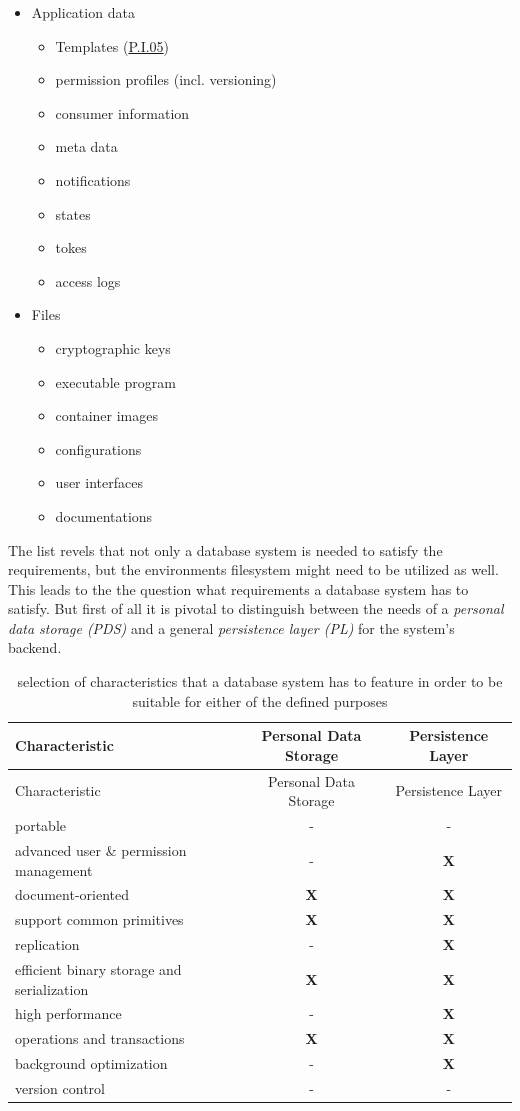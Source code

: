 \documentclass[12pt,english,a4paper,titlepage,cleardoublepage=empty,dottedtoc]{report}
\providecommand{\tightlist}{%
  \setlength{\itemsep}{0pt}\setlength{\parskip}{0pt}}
\begin{document}
\begin{itemize}
\tightlist
\item
  Application data

  \begin{itemize}
  \tightlist
  \item
    Templates (\protect\hyperlink{pi05}{P.I.05})
  \item
    permission profiles (incl. versioning)
  \item
    consumer information
  \item
    meta data
  \item
    notifications
  \item
    states
  \item
    tokes
  \item
    access logs
  \end{itemize}
\item
  Files

  \begin{itemize}
  \tightlist
  \item
    cryptographic keys
  \item
    executable program
  \item
    container images
  \item
    configurations
  \item
    user interfaces
  \item
    documentations
  \end{itemize}
\end{itemize}

The list revels that not only a database system is needed to satisfy the
requirements, but the environments filesystem might need to be utilized
as well. This leads to the the question what requirements a database
system has to satisfy. But first of all it is pivotal to distinguish
between the needs of a \emph{personal data storage (PDS)} and a general
\emph{persistence layer (PL)} for the system's backend.

\begin{longtable}[]{@{}lcc@{}}
\caption{selection of characteristics that a database system has to
feature in order to be suitable for either of the defined purposes
\label{tbl:dbs-features}}\tabularnewline
\toprule
Characteristic & Personal Data Storage & Persistence
Layer\tabularnewline
\midrule
\endfirsthead
\toprule
Characteristic & Personal Data Storage & Persistence
Layer\tabularnewline
\midrule
\endhead
portable & - & -\tabularnewline
advanced user \& permission management & - & \textbf{X}\tabularnewline
document-oriented & \textbf{X} & \textbf{X}\tabularnewline
support common primitives & \textbf{X} & \textbf{X}\tabularnewline
replication & - & \textbf{X}\tabularnewline
efficient binary storage and serialization & \textbf{X} &
\textbf{X}\tabularnewline
high performance & - & \textbf{X}\tabularnewline
operations and transactions & \textbf{X} & \textbf{X}\tabularnewline
background optimization & - & \textbf{X}\tabularnewline
version control & - & -\tabularnewline
\bottomrule
\end{longtable}
\end{document}
